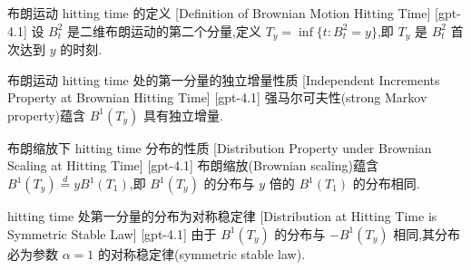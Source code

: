 \documentclass[UTF8]{ctexart}
\begin{document}
    \begin{dfn}
        {布朗运动 hitting time 的定义}
        [Definition of Brownian Motion Hitting Time]
        [gpt-4.1]
        设 $B_t^2$ 是二维布朗运动的第二个分量,定义 $T_y = \operatorname{inf}\{ t : B_t^2 = y \}$,即 $T_y$ 是 $B_t^2$ 首次达到 $y$ 的时刻.
    \end{dfn}
    
    
    
    \begin{ppt}
        {布朗运动 hitting time 处的第一分量的独立增量性质}
        [Independent Increments Property at Brownian Hitting Time]
        [gpt-4.1]
        强马尔可夫性(strong Markov property)蕴含 $B^1(T_y)$ 具有独立增量.
    \end{ppt}
    
    
    
    \begin{ppt}
        {布朗缩放下 hitting time 分布的性质}
        [Distribution Property under Brownian Scaling at Hitting Time]
        [gpt-4.1]
        布朗缩放(Brownian scaling)蕴含 $B^1(T_y) \stackrel{d}{=} y B^1(T_1)$,即 $B^1(T_y)$ 的分布与 $y$ 倍的 $B^1(T_1)$ 的分布相同.
    \end{ppt}
    
    
    
    \begin{crl}
        {hitting time 处第一分量的分布为对称稳定律}
        [Distribution at Hitting Time is Symmetric Stable Law]
        [gpt-4.1]
        由于 $B^1(T_y)$ 的分布与 $-B^1(T_y)$ 相同,其分布必为参数 $\alpha = 1$ 的对称稳定律(symmetric stable law).
    \end{crl}
    
    
    
\end{document}
